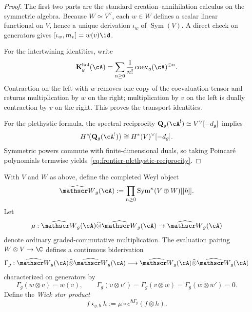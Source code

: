 \begin{proof}
The first two parts are the standard creation--annihilation calculus on the
symmetric algebra. Because $W\simeq V^\vee$, each $w\in W$ defines a scalar
linear functional on $V$, hence a unique derivation $\iota_w$ of
$\operatorname{Sym}(V)$. A direct check on generators gives
$[\iota_w,m_v]=w(v)\id$.

For the intertwining identities, write
\[
\mathbf K_g^{\mathrm{hol}}(\cA)
=
\sum_{n\ge 0}\frac{1}{n!}\operatorname{coev}_g(\cA)^{\odot n}.
\]
Contraction on the left with $w$ removes one copy of the coevaluation tensor and
returns multiplication by $w$ on the right; multiplication by $v$ on the left is
dually contraction by $v$ on the right. This proves the transport identities.

For the plethystic formula, the spectral reciprocity
$\mathbf Q_g(\cA^!)\simeq V^\vee[-d_g]$ implies
\[
H^*\!\bigl(\mathbf Q_g(\cA^!)\bigr)
\cong
H^*(V)^\vee[-d_g].
\]
Symmetric powers commute with finite-dimensional duals, so taking Poincar\'e
polynomials termwise yields~\eqref{eq:frontier-plethystic-reciprocity}.
\end{proof}

\begin{definition}
\label{def:frontier-genus-g-weyl-wick}
With $V$ and $W$ as above, define the completed Weyl object
\begin{equation}\label{eq:frontier-genus-g-weyl-object}
\widehat{\mathscr W}_g(\cA)
:=
\prod_{n\ge 0}\operatorname{Sym}^n(V\oplus W)[[\hbar]].
\end{equation}
Let
\[
\mu:\widehat{\mathscr W}_g(\cA)\widehat\otimes
\widehat{\mathscr W}_g(\cA)\to \widehat{\mathscr W}_g(\cA)
\]
denote ordinary graded-commutative multiplication.
The evaluation pairing $W\otimes V\to\C$ defines a continuous biderivation
\begin{equation}\label{eq:frontier-wick-contraction-operator}
\Gamma_g:
\widehat{\mathscr W}_g(\cA)\widehat\otimes
\widehat{\mathscr W}_g(\cA)
\longrightarrow
\widehat{\mathscr W}_g(\cA)\widehat\otimes
\widehat{\mathscr W}_g(\cA)
\end{equation}
characterized on generators by
\begin{equation}\label{eq:frontier-wick-contraction-on-generators}
\Gamma_g(w\otimes v)=w(v),
\qquad
\Gamma_g(v\otimes v')=\Gamma_g(v\otimes w)=\Gamma_g(w\otimes w')=0.
\end{equation}
Define the \emph{Wick star product}
\begin{equation}\label{eq:frontier-wick-star-product}
f\star_{g,\hbar} h
:=
\mu\circ e^{\hbar\Gamma_g}(f\otimes h).
\end{equation}
\end{definition}

